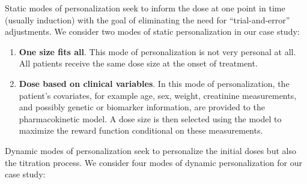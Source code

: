Static modes of personalization seek to inform the dose at one point in time (usually induction) with the goal of eliminating the need for ``trial-and-error'' adjustments.  We consider two modes of static personalization in our case study:

\begin{enumerate}
	\item \textbf{One size fits all}.  This mode of personalization is not very personal at all.  All patients receive the same dose size at the onset of treatment.
	\item \textbf{ Dose based on clinical variables}.  In this mode of personalization, the patient's covariates, for example age, sex, weight, creatinine measurements, and possibly genetic or biomarker information, are provided to the pharmacokinetic model.  A dose size is then selected using the model to maximize the reward function conditional on these measurements.
\end{enumerate}

\noindent Dynamic modes of personalization seek to personalize the initial doses but also the titration process.  We consider four modes of dynamic personalization for our case study:

